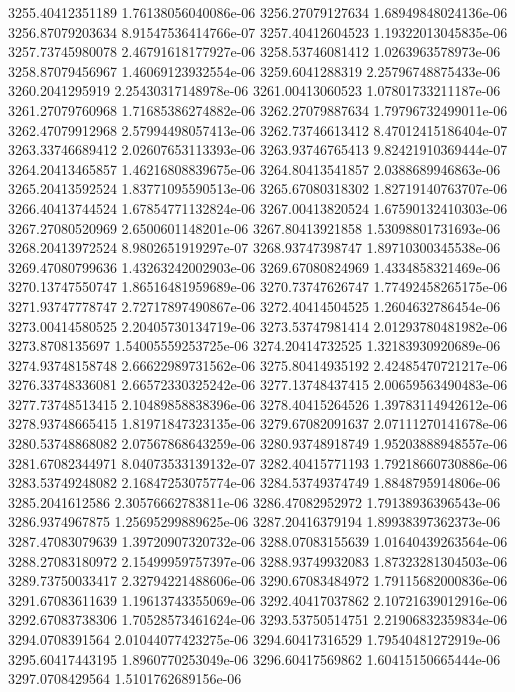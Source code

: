 {3255.40412351189 1.76138056040086e-06
3256.27079127634 1.68949848024136e-06
3256.87079203634 8.91547536414766e-07
3257.40412604523 1.19322013045835e-06
3257.73745980078 2.46791618177927e-06
3258.53746081412 1.0263963578973e-06
3258.87079456967 1.46069123932554e-06
3259.6041288319 2.25796748875433e-06
3260.2041295919 2.25430317148978e-06
3261.00413060523 1.07801733211187e-06
3261.27079760968 1.71685386274882e-06
3262.27079887634 1.79796732499011e-06
3262.47079912968 2.57994498057413e-06
3262.73746613412 8.47012415186404e-07
3263.33746689412 2.02607653113393e-06
3263.93746765413 9.82421910369444e-07
3264.20413465857 1.46216808839675e-06
3264.80413541857 2.0388689946863e-06
3265.20413592524 1.83771095590513e-06
3265.67080318302 1.82719140763707e-06
3266.40413744524 1.67854771132824e-06
3267.00413820524 1.67590132410303e-06
3267.27080520969 2.6500601148201e-06
3267.80413921858 1.53098801731693e-06
3268.20413972524 8.9802651919297e-07
3268.93747398747 1.89710300345538e-06
3269.47080799636 1.43263242002903e-06
3269.67080824969 1.4334858321469e-06
3270.13747550747 1.86516481959689e-06
3270.73747626747 1.77492458265175e-06
3271.93747778747 2.72717897490867e-06
3272.40414504525 1.2604632786454e-06
3273.00414580525 2.20405730134719e-06
3273.53747981414 2.01293780481982e-06
3273.8708135697 1.54005559253725e-06
3274.20414732525 1.32183930920689e-06
3274.93748158748 2.66622989731562e-06
3275.80414935192 2.42485470721217e-06
3276.33748336081 2.66572330325242e-06
3277.13748437415 2.00659563490483e-06
3277.73748513415 2.10489858838396e-06
3278.40415264526 1.39783114942612e-06
3278.93748665415 1.81971847323135e-06
3279.67082091637 2.07111270141678e-06
3280.53748868082 2.07567868643259e-06
3280.93748918749 1.95203888948557e-06
3281.67082344971 8.04073533139132e-07
3282.40415771193 1.79218660730886e-06
3283.53749248082 2.16847253075774e-06
3284.53749374749 1.8848795914806e-06
3285.2041612586 2.30576662783811e-06
3286.47082952972 1.79138936396543e-06
3286.9374967875 1.25695299889625e-06
3287.20416379194 1.89938397362373e-06
3287.47083079639 1.39720907320732e-06
3288.07083155639 1.01640439263564e-06
3288.27083180972 2.15499959757397e-06
3288.93749932083 1.87323281304503e-06
3289.73750033417 2.32794221488606e-06
3290.67083484972 1.79115682000836e-06
3291.67083611639 1.19613743355069e-06
3292.40417037862 2.10721639012916e-06
3292.67083738306 1.70528573461624e-06
3293.53750514751 2.21906832359834e-06
3294.0708391564 2.01044077423275e-06
3294.60417316529 1.79540481272919e-06
3295.60417443195 1.8960770253049e-06
3296.60417569862 1.60415150665444e-06
3297.0708429564 1.5101762689156e-06
}
